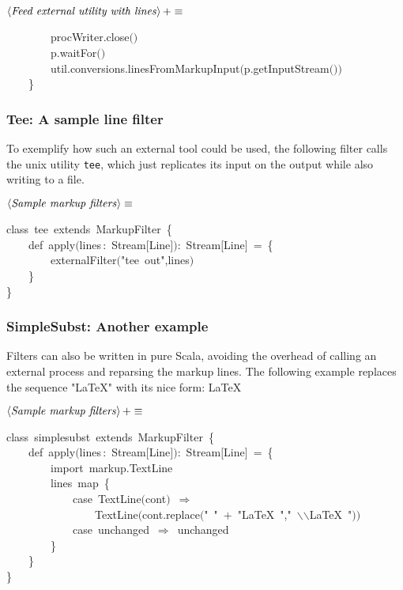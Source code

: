 \documentclass[a4paper,12pt]{article}
\begin{document}
$\left<\mbox{\emph{Feed external utility with lines}}\right>+\equiv$
\begin{program}~~~~~~~~procWriter.close$($$)$
\\~~~~~~~~p.waitFor$($$)$
\\~~~~~~~~util.conversions.linesFromMarkupInput$($p.getInputStream$($$)$$)$
\\~~~~{\small\}}
\\[0.5em]\end{program}


\subsubsection{Tee: A sample line filter}
To exemplify how such an external tool could be used, the following filter calls
the unix utility \texttt{tee}, which just replicates its input on the output while
also writing to a file.

$\left<\mbox{\emph{Sample markup filters}}\right>\equiv$
\begin{program}{\vem class}~tee~{\vem extends}~MarkupFilter~{\small\{}
\\~~~~{\vem def}~apply$($lines\,{\rm :}~Stream$[$Line$]$$)${\rm :}~Stream$[$Line$]$~=~{\small\{}
\\~~~~~~~~externalFilter$($"tee~out",lines$)$
\\~~~~{\small\}}
\\{\small\}}
\\[0.5em]\end{program}



\subsubsection{SimpleSubst: Another example}
Filters can also be written in pure Scala, avoiding the overhead of calling an
external process and reparsing the markup lines. The following example replaces
the sequence "LaTeX" with its nice form: \LaTeX

$\left<\mbox{\emph{Sample markup filters}}\right>+\equiv$
\begin{program}{\vem class}~simplesubst~{\vem extends}~MarkupFilter~{\small\{}
\\~~~~{\vem def}~apply$($lines\,{\rm :}~Stream$[$Line$]$$)${\rm :}~Stream$[$Line$]$~=~{\small\{}
\\~~~~~~~~{\vem import}~markup.TextLine
\\~~~~~~~~lines~map~{\small\{}
\\~~~~~~~~~~~~{\vem case}~TextLine$($cont$)$~$\Rightarrow$
\\~~~~~~~~~~~~~~~~TextLine$($cont.replace$($"~"~$+$~"LaTeX~","~$\backslash$$\backslash$LaTeX~"$)$$)$
\\~~~~~~~~~~~~{\vem case}~unchanged~$\Rightarrow$~unchanged
\\~~~~~~~~{\small\}}
\\~~~~{\small\}}
\\{\small\}}
\\[0.5em]\end{program}
\end{document}
